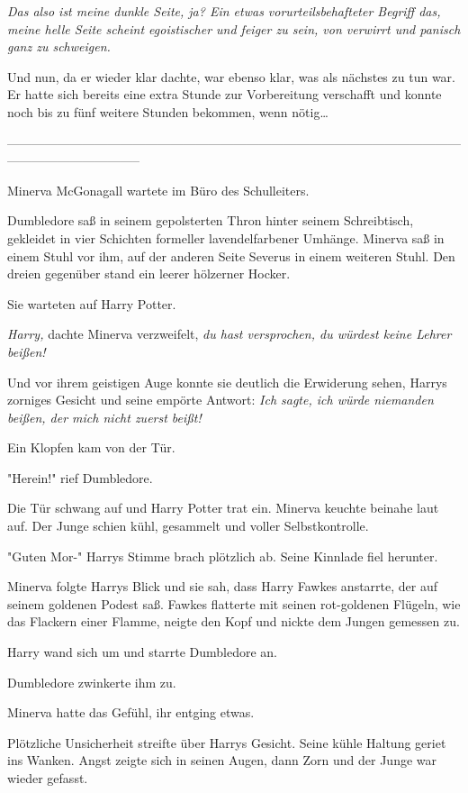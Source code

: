 {\emph{Das also ist meine dunkle Seite, ja? Ein etwas vorurteilsbehafteter Begriff das, meine helle Seite scheint egoistischer und feiger zu sein, von verwirrt und panisch ganz zu schweigen.}

Und nun, da er wieder klar dachte, war ebenso klar, was als nächstes zu tun war. Er hatte sich bereits eine extra Stunde zur Vorbereitung verschafft und konnte noch bis zu fünf weitere Stunden bekommen, wenn nötig…

--------------------------------------------------------------------------------------------------------------------------------------------

Minerva McGonagall wartete im Büro des Schulleiters.

Dumbledore saß in seinem gepolsterten Thron hinter seinem Schreibtisch, gekleidet in vier Schichten formeller lavendelfarbener Umhänge. Minerva saß in einem Stuhl vor ihm, auf der anderen Seite Severus in einem weiteren Stuhl. Den dreien gegenüber stand ein leerer hölzerner Hocker.

Sie warteten auf Harry Potter.

\emph{Harry,} dachte Minerva verzweifelt, \emph{du hast versprochen, du würdest keine Lehrer beißen!}

Und vor ihrem geistigen Auge konnte sie deutlich die Erwiderung sehen, Harrys zorniges Gesicht und seine empörte Antwort: \emph{Ich sagte, ich würde niemanden beißen, der mich nicht zuerst beißt!}

Ein Klopfen kam von der Tür.

"Herein!" rief Dumbledore.

Die Tür schwang auf und Harry Potter trat ein. Minerva keuchte beinahe laut auf. Der Junge schien kühl, gesammelt und voller Selbstkontrolle.

"Guten Mor-" Harrys Stimme brach plötzlich ab. Seine Kinnlade fiel herunter.

Minerva folgte Harrys Blick und sie sah, dass Harry Fawkes anstarrte, der auf seinem goldenen Podest saß. Fawkes flatterte mit seinen rot-goldenen Flügeln, wie das Flackern einer Flamme, neigte den Kopf und nickte dem Jungen gemessen zu.

Harry wand sich um und starrte Dumbledore an.

Dumbledore zwinkerte ihm zu.

Minerva hatte das Gefühl, ihr entging etwas.

Plötzliche Unsicherheit streifte über Harrys Gesicht. Seine kühle Haltung geriet ins Wanken. Angst zeigte sich in seinen Augen, dann Zorn und der Junge war wieder gefasst.

}
